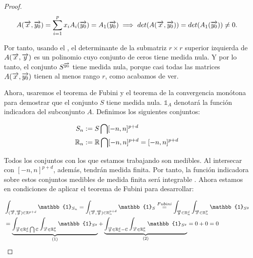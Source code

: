 \begin{proof}
    \begin{equation}
        A(\overrightarrow{x}, \overrightarrow{y_0}) = \sum_{i = 1}^{p} x_i A_i(\overrightarrow{y_0}) = A_1(\overrightarrow{y_0}) \implies det(A(\overrightarrow{x}, \overrightarrow{y_0})) = det(A_1(\overrightarrow{y_0})) \neq 0.
    \end{equation}

    Por tanto, usando el , el determinante de la submatriz $r \times r$ superior izquierda de $A(\overrightarrow{x}, \overrightarrow{y})$ es un polinomio cuyo conjunto de ceros tiene medida nula. Y por lo tanto, el conjunto $S^{\overrightarrow{y_0}}$ tiene medida nula, porque casi todas las matrices $A(\overrightarrow{x}, \overrightarrow{y_0})$ tienen al menos rango $r$, como acabamos de ver.

    Ahora, usaremos el teorema de Fubini y el teorema de la convergencia monótona para demostrar que el conjunto $S$ tiene medida nula. $\mathbb{1}_A$ denotará la función indicadora del subconjunto $A$. Definimos los siguientes conjuntos:

    \begin{equation}
        \begin{split}
            S_n &:= S \bigcap [-n, n]^{p+d} \\
            \mathbb{R}_n &:= \mathbb{R} \bigcap [-n, n]^{p+d} = [-n, n]^{p+d}
        \end{split}
    \end{equation}

    Todos los conjuntos con los que estamos trabajando son medibles. Al intersecar con $[-n, n]^{p+d}$, además, tendrán medida finita. Por tanto, la función indicadora sobre estos conjuntos medibles de medida finita será integrable \footnotemark. Ahora estamos en condiciones de aplicar el teorema de Fubini para desarrollar:


    \begin{equation}
        \begin{split}
            &\int_{(\nv{x}, \nv{y}) \in \R^{p+d}} \mathbb{1}_{S_n} = \int_{(\nv{x},\nv{y}) \in \R_n^{p+d}} \mathbb{1}_{S} \encima{=}{Fubini} \int_{\nv{y} \in \R_n^d} \int_{\nv{x} \in \R_n^p} \mathbb{1}_{S^y} \\
            &= \comentardebajo{\int_{\nv{y} \in \R_n^d \interseccion \mathcal{C}} \int_{\nv{x} \in \R^p_n} \mathbb{1}_{S^y}}{(1)} + \comentardebajo{\int_{\nv{y} \in \R_n^d - \mathcal{C}} \int_{\nv{x} \in \R^p_n} \mathbb{1}_{S^y}}{(2)} = 0 + 0 = 0
        \end{split}
    \end{equation}


\end{proof}
